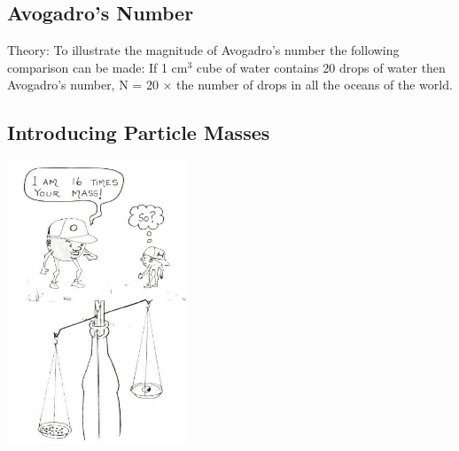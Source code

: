 \begin{multicols}{2}
\columnbreak

\subsection{Avogadro's Number} 


\begin{description*}
\item[Theory:]{To illustrate the magnitude of Avogadro's
number the following comparison can be made:
If 1 cm$^3$ cube of water contains 20 drops of water
then Avogadro's number, N = 20 $\times$ the number of
drops in all the oceans of the world.}
\end{description*}

\subsection{Introducing Particle Masses}

\begin{center}
\includegraphics[width=0.4\textwidth]{./img/source/particle-mass.jpg}
\end{center}


\end{multicols}
